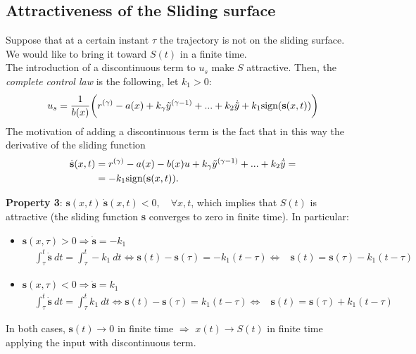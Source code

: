 \subsection{Attractiveness of the Sliding surface}
Suppose that at a certain instant $\tau$ the trajectory is not on the sliding surface. We would like to bring it toward $S(t)$ in a finite time. \\
The introduction of a discontinuous term to $u_s$ make $S$ attractive. Then, the \textit{complete control law} is the following, let $k_1>0$: 
$$ u_s=\frac{1}{b(x)}\bigg(r^{(\gamma)}-a(x)+k_\gamma \Tilde{y}^{(\gamma-1)}+...+k_2 \dot{\Tilde{y}} +k_1 \text{sign}(\textbf{s}(x,t))\bigg)$$
The motivation of adding a discontinuous term is the fact that in this way the derivative of the sliding function 
\begin{align}
    \dot{\textbf{s}}(x,t)&= r^{(\gamma)}-a(x)-b(x)u+k_\gamma \Tilde{y}^{(\gamma-1)}+...+k_2 \dot{\Tilde{y}}=\\
    &=-k_1\text{sign}(\textbf{s}(x,t)).
\end{align}

\noindent
{\color{red}\textbf{Property 3}}:  $\textbf{s}(x,t) \ \dot{\textbf{s}}(x,t)<0,\quad \forall x,t$, which implies that $S(t)$ is attractive (the sliding function \textbf{s} converges to zero in finite time). In particular: 
\begin{itemize}
    \item $\textbf{s}(x,\tau)>0 \Rightarrow \dot{\textbf{s}}=-k_1 $
    \begin{align*}
        &\int_{\tau}^{t} \dot{\textbf{s}}\ dt = \int_{\tau}^{t} -k_1\ dt 
        \Longleftrightarrow \textbf{s}(t)-\textbf{s}(\tau)=-k_1(t-\tau) \Longleftrightarrow
        &\textbf{s}(t)=\textbf{s}(\tau)-k_1(t-\tau)
    \end{align*}
    \item $\textbf{s}(x,\tau)<0 \Rightarrow \dot{\textbf{s}}=k_1$
    \begin{align*}
       &\int_{\tau}^{t} \dot{\textbf{s}}\ dt = \int_{\tau}^{t} k_1\ dt 
        \Longleftrightarrow \textbf{s}(t)-\textbf{s}(\tau)=k_1(t-\tau) \Longleftrightarrow
        &\textbf{s}(t)=\textbf{s}(\tau)+k_1(t-\tau)
    \end{align*}
\end{itemize}

\noindent
In both cases, $\textbf{s}(t)\rightarrow 0$ in finite time $\Rightarrow$ $x(t)\rightarrow S(t)$ in finite time applying the input with discontinuous term.

